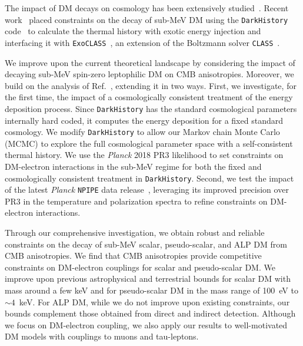 \documentclass[aps,prd,twocolumn,showpacs,superscriptaddress,nofootinbib,preprintnumbers]{revtex4-2}
\begin{document}
The impact of DM decays on cosmology has been extensively studied~\cite{Adams:1998nr, Chen:2003gz, 2012PhRvD..85d3522F,Slatyer:2012yq, Poulin:2016nat,Slatyer:2016qyl,Liu:2016cnk, Poulin:2016anj, Cang:2020exa, Liu:2023nct, Capozzi:2023xie, 2024arXiv240813305X}. Recent work~\cite{Capozzi:2023xie,Liu:2023nct,2024arXiv240813305X} placed constraints on the decay of sub-MeV DM using the \texttt{DarkHistory} code~\cite{Liu:2019bbm, Liu:2023fgu} to calculate the thermal history with exotic energy injection and interfacing it with \texttt{ExoCLASS}~\cite{Stocker:2018avm}, an extension of the Boltzmann solver \texttt{CLASS}~\cite{Blas:2011rf}.

We improve upon the current theoretical landscape by considering the impact of decaying sub-MeV spin-zero leptophilic DM on CMB anisotropies.
Moreover, we build on the analysis of Ref.~\cite{2024arXiv240813305X}, extending it in two ways.
First, we investigate, for the first time, the impact of a cosmologically consistent treatment of the energy deposition process.
Since \texttt{DarkHistory} has the standard cosmological parameters internally hard coded, it computes the energy deposition for a fixed standard cosmology.
We modify \texttt{DarkHistory} to allow our Markov chain Monte Carlo (MCMC) to explore the full cosmological parameter space with a self-consistent thermal history.
We use the \textit{Planck} 2018 PR3 likelihood to set constraints on DM-electron interactions in the sub-MeV regime for both the fixed and cosmologically consistent treatment in \texttt{DarkHistory}. Second, we test the impact of the latest \textit{Planck} \texttt{NPIPE} data release~\cite{Planck:2020olo}, leveraging its improved precision over PR3 in the temperature and polarization spectra to refine constraints on DM-electron interactions.

Through our comprehensive investigation, we obtain robust and reliable constraints on the decay of sub-MeV scalar, pseudo-scalar, and ALP DM from CMB anisotropies.
We find that CMB anisotropies provide competitive constraints on DM-electron couplings for scalar and pseudo-scalar DM.
We improve upon previous astrophysical and terrestrial bounds for scalar DM with mass around a few keV and for pseudo-scalar DM in the mass range of 100~eV to $\sim 4$~keV.
For ALP DM, while we do not improve upon existing constraints, our bounds complement those obtained from direct and indirect detection.
Although we focus on DM-electron coupling, we also apply our results to well-motivated DM models with couplings to muons and tau-leptons.
\end{document}
